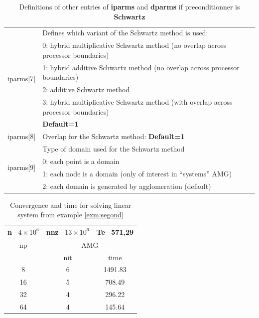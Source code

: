 \documentclass[a4paper,twoside,12pt]{book}
\begin{document}
\begin{table}[hbtp]
 \begin{tabular}{|l|l|} \hline
\multirow{6}{*}{iparms[7]}& Defines which variant of the Schwartz method is
used:\\
& 0: hybrid multiplicative Schwartz method (no overlap across processor
boundaries)\\
& 1: hybrid additive Schwartz method (no overlap across processor boundaries)\\
& 2: additive Schwartz method\\
& 3: hybrid multiplicative Schwartz method (with overlap across processor
boundaries)\\
& \textbf{ Default=1}\\ \hline

iparms[8]& Overlap for the Schwartz method: \textbf{ Default=1}\\ \hline
\multirow{4}{*}{iparms[9]} & Type of domain used for the Schwartz method\\
& 0: each point is a domain \\
& 1: each node is a domain (only of interest in ``systems'' AMG)\\
& 2: each domain is generated by agglomeration (default) \\ \hline
 \end{tabular}
\caption{Definitions of other entries of \textbf{iparms} and \textbf{dparms} if
preconditionner is \textbf{Schwartz}}
\label{AMGHypre}
\end{table}

\begin{table}
\begin{center}
\begin{tabular}{|c|c|c|}
\hline
\multicolumn{1}{|c||}{\textbf{n=$ 4 \times 10^6 $}} &
\multicolumn{1}{|c||}{\textbf{nnz=$13\times10^6$}} &
\multicolumn{1}{|c|}{\textbf{Te=571,29}}\\ \hline
\multirow{1}{*}{np} & \multicolumn{2}{|c|}{AMG}  \\ \cline{2-3}
& nit & time  \\ \hline
8 & 6 &  1491.83 \\ \hline
16 & 5 & 708.49  \\ \hline
32 & 4 & 296.22  \\ \hline
64 & 4 &  145.64 \\ \hline
\end{tabular}
\end{center}
\caption{Convergence and time for solving linear system from example
\ref{exm:segond} }
\label{HypreResult}
\end{table}
\end{document}
